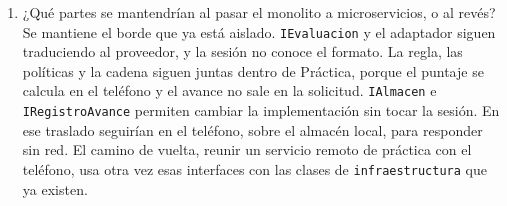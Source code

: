 \documentclass[11pt]{article}
\begin{document}
\begin{enumerate}
  \item ¿Qué partes se mantendrían al pasar el monolito a microservicios, o al revés? Se mantiene el borde que ya está aislado. \texttt{IEvaluacion} y el adaptador siguen traduciendo al proveedor, y la sesión no conoce el formato. La regla, las políticas y la cadena siguen juntas dentro de Práctica, porque el puntaje se calcula en el teléfono y el avance no sale en la solicitud. \texttt{IAlmacen} e \texttt{IRegistroAvance} permiten cambiar la implementación sin tocar la sesión. En ese traslado seguirían en el teléfono, sobre el almacén local, para responder sin red. El camino de vuelta, reunir un servicio remoto de práctica con el teléfono, usa otra vez esas interfaces con las clases de \texttt{infraestructura} que ya existen.
\end{enumerate}
\end{document}
